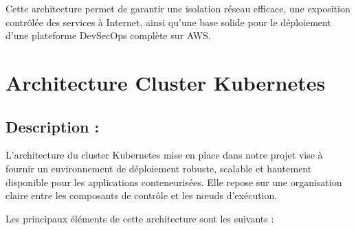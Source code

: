 Cette architecture permet de garantir une isolation réseau efficace, une exposition contrôlée des services à Internet, ainsi qu’une base solide pour le déploiement d’une plateforme DevSecOps complète sur AWS.
\section{Architecture Cluster Kubernetes}

\subsection{Description :}

L’architecture du cluster Kubernetes mise en place dans notre projet vise à fournir un environnement de déploiement robuste, scalable et hautement disponible pour les applications conteneurisées. Elle repose sur une organisation claire entre les composants de contrôle et les nœuds d’exécution.

Les principaux éléments de cette architecture sont les suivants :

